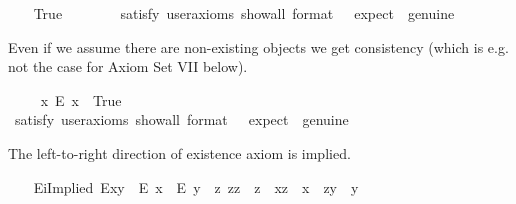 \begin{isabellebody}
\ \ \isamarkupfalse%
\ True\ \ %
\isanewline
\ \ \ \ \isamarkupfalse%
\ {\isacharbrackleft}satisfy{\isacharcomma}\ user{\isacharunderscore}axioms{\isacharcomma}\ show{\isacharunderscore}all{\isacharcomma}\ format\ {\isacharequal}\ {}{\isacharcomma}\ expect\ {\isacharequal}\ genuine{\isacharbrackright}%
\isadelimproof
\ %
\endisadelimproof
%
\isatagproof
{}\isamarkupfalse%
%
\endisatagproof
{\isafoldproof}%
%
\isadelimproof
%
\endisadelimproof
%
\begin{isamarkuptext}%
Even if we assume there are non-existing objects we get consistency (which is e.g. not the
case for Axiom Set VII below).%
\end{isamarkuptext}\isamarkuptrue%
\ \ \isamarkupfalse%
\ \ {\isachardoublequoteopen}{\isasymexists}x{\isachardot}\ \isactrlbold {\isasymnot}{\isacharparenleft}E\ x{\isacharparenright}{\isachardoublequoteclose}\ \ True\ \ %
\ \isanewline
\ \ \ \ \isamarkupfalse%
\ {\isacharbrackleft}satisfy{\isacharcomma}\ user{\isacharunderscore}axioms{\isacharcomma}\ show{\isacharunderscore}all{\isacharcomma}\ format\ {\isacharequal}\ {}{\isacharcomma}\ expect\ {\isacharequal}\ genuine{\isacharbrackright}%
\isadelimproof
\ %
\endisadelimproof
%
\isatagproof
{}\isamarkupfalse%
%
\endisatagproof
{\isafoldproof}%
%
\isadelimproof
%
\endisadelimproof
%
\begin{isamarkuptext}%
The left-to-right direction of existence axiom  is implied.%
\end{isamarkuptext}\isamarkuptrue%
\ \ \isamarkupfalse%
\ E\isactrlsub iImplied{\isacharcolon}\ {\isachardoublequoteopen}E{\isacharparenleft}x{\isasymcdot}y{\isacharparenright}\ \isactrlbold {\isasymrightarrow}\ {\isacharparenleft}E\ x\ \isactrlbold {\isasymand}\ E\ y\ \isactrlbold {\isasymand}\ {\isacharparenleft}\isactrlbold {\isasymexists}z{\isachardot}\ z{\isasymcdot}z\ {\isasymcong}\ z\ \isactrlbold {\isasymand}\ x{\isasymcdot}z\ {\isasymcong}\ x\ \isactrlbold {\isasymand}\ z{\isasymcdot}y\ {\isasymcong}\ y{\isacharparenright}{\isacharparenright}{\isachardoublequoteclose}\ \isanewline
%
\isadelimproof
\ \ \ \ %
\endisadelimproof
%
\isatagproof
{}\isamarkupfalse%

\end{isabellebody}
